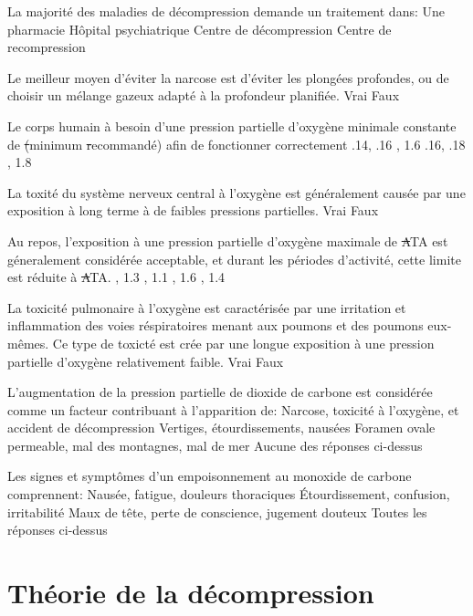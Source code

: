 \documentclass[english,10pt,a4paper,twoside]{article}
\begin{document}
\begin{outline}
		\1 La majorité des maladies de décompression demande un traitement dans:
			\2 Une pharmacie
			\2 Hôpital psychiatrique
			\2 Centre de décompression
			\2 Centre de recompression

		\1 Le meilleur moyen d'éviter la narcose est d'éviter les plongées profondes, ou de choisir un mélange gazeux adapté à la profondeur planifiée.
			\2 Vrai
			\2 Faux

		\1 Le corps humain à besoin d'une pression partielle d'oxygène minimale constante de \st (minimum \st recommandé) afin de fonctionner correctement
			\2 .14, .16 
			\2 1.4, 1.6 
			\2 .16, .18 
			\2 1.6, 1.8

		\1 La toxité du système nerveux central à l'oxygène est généralement causée par une exposition à long terme à de faibles pressions partielles.
			\2 Vrai
			\2 Faux

		\1 Au repos, l'exposition à une pression partielle d'oxygène maximale de \st ATA est géneralement considérée acceptable, et durant les périodes d'activité, cette limite est réduite à \st ATA.
			\2 1.1, 1.3
			\2 1.3, 1.1
			, 1.6
			, 1.4

		\1 La toxicité pulmonaire à l'oxygène est caractérisée par une irritation et inflammation des voies réspiratoires menant aux poumons et des poumons eux-mêmes. Ce type de toxicté est crée par une longue exposition à une pression partielle d'oxygène relativement faible.
			\2 Vrai
			\2 Faux

		\1 L'augmentation de la pression partielle de dioxide de carbone est considérée comme un facteur contribuant à l'apparition de:
			\2 Narcose, toxicité à l'oxygène, et accident de décompression
			\2 Vertiges, étourdissements, nausées
			\2 Foramen ovale permeable, mal des montagnes, mal de mer
			\2 Aucune des réponses ci-dessus

		\1 Les signes et symptômes d'un empoisonnement au monoxide de carbone comprennent:
			\2 Nausée, fatigue, douleurs thoraciques
			\2 Étourdissement, confusion, irritabilité
			\2 Maux de tête, perte de conscience, jugement douteux
			\2 Toutes les réponses ci-dessus
	\end{outline}
	\vfill
	\pagebreak

	\section{Théorie de la décompression}
\end{document}
